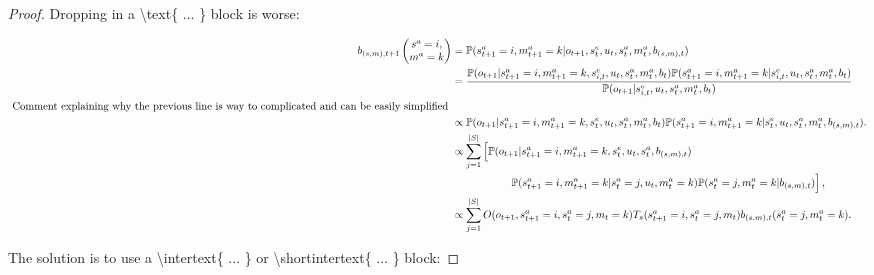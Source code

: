 \documentclass{article}
\begin{document}
\begin{proof}
\newpage

Dropping in a \textbackslash text\{ ... \} block is worse:

\begin{align}
     b_{(s,m),t+1}\left(\begin{matrix}
        s^a = i, \\ m^a = k
    \end{matrix} \right) &= \mathbb{P}( s_{t+1}^a = i, m_{t+1}^a = k | o_{t+1}, s_{t}^e, u_{t}, s_t^a, m_t^a, b_{(s,m),t} ) \\
    &= \frac{\mathbb{P}( o_{t+1} | s_{t+1}^a = i, m_{t+1}^a = k, s_{i,t}^e, u_{t},  s_t^a, m_t^a, b_{t} ) \mathbb{P}( s_{t+1}^a = i, m_{t+1}^a = k |  s_{i,t}^e, u_{t},  s_t^a, m_t^a, b_{t} )}{\mathbb{P}(o_{t+1} | s_{i,t}^e, u_{t}, s_t^a, m_t^a, b_{t}   ) } \\
    \text{ Comment explaining why the previous line is way to complicated and can be easily simplified } \\
          &\propto \mathbb{P}( o_{t+1} |  s_{t+1}^a = i, m_{t+1}^a = k, s_t^e, u_{t}, s_t^a, m_t^a, b_{t} ) \mathbb{P}( s_{t+1}^a = i, m_{t+1}^a = k |  s_t^e, u_{t}, s_{t}^a, m_{t}^a, b_{(s,m),t} ).  \\
    &\propto \sum_{j=1}^{|S|} \left[ \mathbb{P}( o_{t+1} |  s_{t+1}^a = i, m_{t+1}^a = k, s_t^e, u_{t}, s_t^a, b_{(s,m),t} ) \right. \nonumber \\ 
    &~~~~~~~~~~~~~~~~\left. \mathbb{P}( s_{t+1}^a = i, m_{t+1}^a = k | s_{t}^a=j, u_{t}, m_t^a = k ) \mathbb{P}( s_{t}^a = j, m_{t}^a = k |  b_{(s,m),t} ) \right],   \\
    &\propto  \sum_{j=1}^{|S|} O(o_{t+1},s_{t+1}^a=i,s_t^a=j,m_t=k) T_s(s_{t+1}^a=i, s_{t}^a=j, m_t ) b_{(s,m),t}(s_t^a = j, m_{t}^a = k).
\end{align}
 


\newpage

The solution is to use a \textbackslash intertext\{ ... \} or \textbackslash shortintertext\{ ... \} block:


\end{proof}
\end{document}
